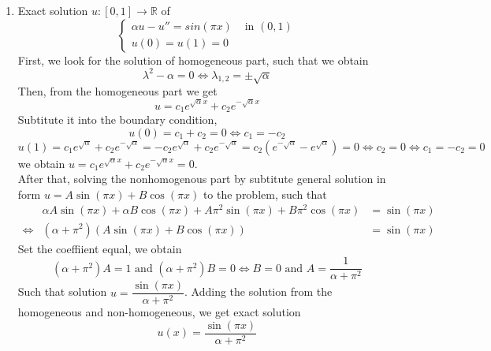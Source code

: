\documentclass[a4paper,10pt]{article}
\newcommand{\R}{\mathbb{R}}
\begin{document}
	\begin{enumerate}[label=(\alph*)]
		\item Exact solution $ u : [0,1] \rightarrow \R $ of
		\[ \begin{cases}
		\alpha u - u'' = sin(\pi x) & \text{ in } (0,1)\\
		u(0)=u(1)=0
		\end{cases} \]
		First, we look for the solution of homogeneous part, such that we obtain
		\[ \lambda^2-\alpha=0 \Leftrightarrow \lambda_{1,2}=\pm \sqrt{\alpha} \]
		Then, from the homogeneous part we get
		\[ u = c_{1} e^{\sqrt{\alpha}x} + c_{2} e^{-\sqrt{\alpha}x} \]
		Subtitute it into the boundary condition,
		\[ u(0) = c_{1}+c_{2}=0 \Leftrightarrow c_{1}=-c_{2} \]
		\[ u(1) = c_{1} e^{\sqrt{\alpha}} + c_{2} e^{-\sqrt{\alpha}} = -c_{2} e^{\sqrt{\alpha}} + c_{2} e^{-\sqrt{\alpha}} = c_{2} (e^{-\sqrt{\alpha}}-e^{\sqrt{\alpha}}) =0 \Leftrightarrow c_{2}=0 \Leftrightarrow c_{1} = -c_{2} =0 \]
		we obtain $ u= c_{1} e^{\sqrt{\alpha}x} + c_{2} e^{-\sqrt{\alpha}x}=0 $.\\
		After that, solving the nonhomogenous part by subtitute general solution in form $ u=A\sin(\pi x)+B\cos(\pi x) $ to the problem, such that
		\begin{eqnarray}\nonumber
		&\alpha A\sin(\pi x)+\alpha B\cos(\pi x)+ A\pi^2\sin(\pi x)+B\pi^2\cos(\pi x) & = \sin(\pi x)\\ \nonumber
		\Leftrightarrow& (\alpha+\pi^2)(A\sin(\pi x)+B\cos(\pi x)) &= \sin(\pi x)
		\end{eqnarray}
		Set the coeffiient equal, we obtain 
		\[ (\alpha+\pi^2)A = 1 \text{ and } (\alpha+\pi^2)B =0 \Leftrightarrow B=0 \text{ and } A = \dfrac{1}{\alpha+\pi^2}\]
		Such that solution $ u=\dfrac{\sin(\pi x)}{\alpha+\pi^2} $. Adding the solution from the homogeneous and non-homogeneous, we get exact solution
		\[ u(x)=\dfrac{\sin(\pi x)}{\alpha+\pi^2} \]
		

\end{enumerate}
\end{document}
